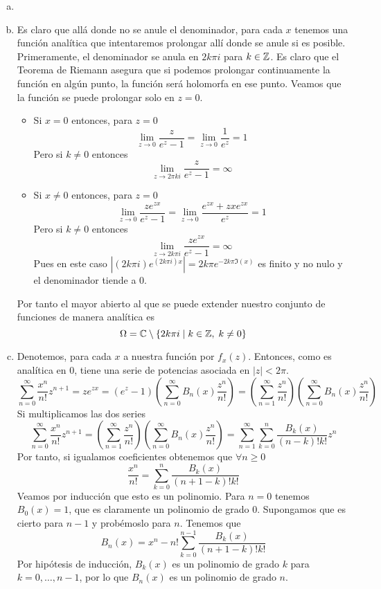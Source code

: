 \documentclass[twoside]{article}
\begin{document}
\begin{solucion}
\begin{enumerate}[(a)]
\item[]
\item Es claro que allá donde no se anule el denominador, para cada $x$ tenemos una función analítica que intentaremos prolongar allí donde se anule si es posible. Primeramente, el denominador se anula en $2k\pi i$ para $k\in \mathbb{Z}$. Es claro que el Teorema de Riemann asegura que si podemos prolongar continuamente la función en algún punto, la función será holomorfa en ese punto. Veamos que la función se puede prolongar solo en $z=0$.
\begin{itemize}
\item Si $x=0$ entonces, para $z=0$
$$
\lim_{z\to 0}\frac{z}{e^z-1} = \lim_{z\to 0}\frac{1}{e^z} = 1
$$
Pero si $k\neq 0$ entonces
$$
\lim_{z\to 2\pi k i}\frac{z}{e^z-1} = \infty
$$
\item Si $x\neq 0$ entonces, para $z=0$
$$
\lim_{z\to 0}\frac{ze^{zx}}{e^z-1} = \lim_{z\to 0}\frac{e^{zx}+zxe^{zx}}{e^z} = 1
$$
Pero si $k\neq 0$ entonces
$$
\lim_{z\to 2k\pi i}\frac{ze^{zx}}{e^z-1} = \infty
$$
Pues en este caso $|(2k\pi i)e^{(2k\pi i)x}| = 2k\pi e^{-2k\pi \Im(x)}$ es finito y no nulo y el denominador tiende a $0$.
\end{itemize}
Por tanto el mayor abierto al que se puede extender nuestro conjunto de funciones de manera analítica es
$$
\Omega = \mathbb{C}\setminus\{2k\pi i \mid k\in \mathbb{Z},\; k\neq 0\}
$$
\item Denotemos, para cada $x$ a nuestra función por $f_x(z)$. Entonces, como es analítica en $0$, tiene una serie de potencias asociada en $|z|<2\pi$. 
\[ \sum_{n=0}^\infty \frac{x^n}{n!}z^{n+1}= z e^{zx} =(e^z-1) \left(\sum_{n=0}^\infty B_n(x) \frac{z^n}{n!}\right)=\left( \sum_{n=1}^\infty \frac{z^n}{n!}\right)\left(\sum_{n=0}^\infty B_n(x) \frac{z^n}{n!}\right)\]
Si multiplicamos las dos series
\[ \sum_{n=0}^\infty \frac{x^n}{n!}z^{n+1}= \left( \sum_{n=1}^\infty \frac{z^n}{n!}\right)\left(\sum_{n=0}^\infty B_n(x) \frac{z^n}{n!}\right) = \sum_{n=1}^\infty\sum_{k=0}^{n}\frac{B_k(x)}{(n-k)!k!} z^n \]
Por tanto, si igualamos coeficientes obtenemos que $\forall n\geq 0$
$$
\frac{x^{n}}{n!} = \sum_{k=0}^{n} \frac{B_k(x)}{(n+1-k)!k!}
$$
Veamos por inducción que esto es un polinomio. Para $n=0$ tenemos $B_0(x) = 1$, que es claramente un polinomio de grado $0$. Supongamos que es cierto para $n-1$ y probémoslo para $n$. Tenemos que
$$
B_n(x) = x^n - n!\sum_{k=0}^{n-1} \frac{B_k(x)}{(n+1-k)!k!}
$$
Por hipótesis de inducción, $B_k(x)$ es un polinomio de grado $k$ para $k=0,\dotsc,n-1$, por lo que $B_n(x)$ es un polinomio de grado $n$.

\end{enumerate}
\end{solucion}
\end{document}
